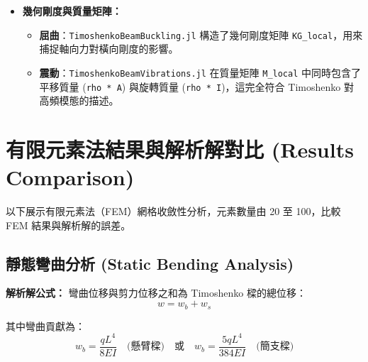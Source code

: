\documentclass[UTF8, a4paper, 12pt]{ctexart}
\begin{document}
\begin{itemize}
要精確積分 $n$ 階多項式，需要至少 $n/2 + 1$ 個高斯點。因此對於 2 階多項式，2 個高斯點就是完整積分。

\textbf{數學表達：}
\begin{equation}
  \text{單點積分：} \quad \int_{-1}^{1} f(\xi) d\xi \approx f(0) \cdot 2
\end{equation}
\begin{equation}
  \text{完整積分：} \quad \int_{-1}^{1} f(\xi) d\xi \approx \sum_{i=1}^{2} f(\xi_i) \cdot w_i, \quad \xi_i = \pm\frac{1}{\sqrt{3}}, w_i = 1
\end{equation}

本專案採用單點積分版本的 \texttt{TimoshenkoBeam.jl} 作為主要實現，並提供完整積分版本 \texttt{TimoshenkoBeamFullIntegration.jl} 用於教學對比。

  \item \textbf{幾何剛度與質量矩陣：}
  \begin{itemize}
    \item \textbf{屈曲}：\texttt{TimoshenkoBeamBuckling.jl} 構造了幾何剛度矩陣 \texttt{KG\_local}，用來捕捉軸向力對橫向剛度的影響。
    \item \textbf{震動}：\texttt{TimoshenkoBeamVibrations.jl} 在質量矩陣 \texttt{M\_local} 中同時包含了平移質量 (\texttt{rho * A}) 與旋轉質量 (\texttt{rho * I})，這完全符合 Timoshenko 對高頻模態的描述。
  \end{itemize}
\end{itemize}

\section{有限元素法結果與解析解對比 (Results Comparison)}

以下展示有限元素法（FEM）網格收斂性分析，元素數量由 20 至 100，比較 FEM 結果與解析解的誤差。

\subsection{靜態彎曲分析 (Static Bending Analysis)}

\textbf{解析解公式：}
彎曲位移與剪力位移之和為 Timoshenko 樑的總位移：
\begin{equation}
  w = w_b + w_s
\end{equation}

其中彎曲貢獻為：
\begin{equation}
  w_b = \frac{qL^4}{8EI} \quad \text{(懸臂樑)} \quad \text{或} \quad w_b = \frac{5qL^4}{384EI} \quad \text{(簡支樑)}
\end{equation}
\end{document}
